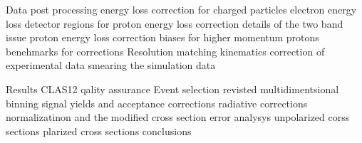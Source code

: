 \documentclass[12pt,twoside]{mitthesis}
\begin{document}
Data post processing
energy loss correction for charged particles
electron energy loss
detector regions for proton energy loss correction
details of the two band issue 
proton energy loss correction
biases for higher momentum protons
benehmarks for corrections
Resolution matching 
kinematics correction of experimental data
smearing the simulation data

Results
CLAS12 qality assurance
Event selection revisted
multidimentsional binning
signal yields and acceptance corrections
radiative corrections
normalizatinon and the modified cross section
error analysys
unpolarized corss sections
plarized cross sections
conclusions








\appendix


\end{document}
